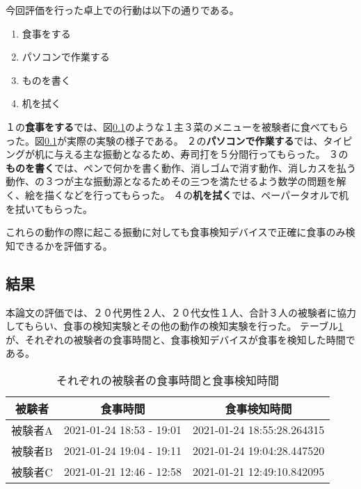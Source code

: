 今回評価を行った卓上での行動は以下の通りである。

\begin{enumerate}
  \item 食事をする
  \item パソコンで作業する
  \item ものを書く
  \item 机を拭く
\end{enumerate}

１の\textbf{食事をする}では、図\ref{}のような１主３菜のメニューを被験者に食べてもらった。図\ref{}が実際の実験の様子である。
２の\textbf{パソコンで作業する}では、タイピングが机に与える主な振動となるため、寿司打\cite{sushida}を５分間行ってもらった。
３の\textbf{ものを書く}では、ペンで何かを書く動作、消しゴムで消す動作、消しカスを払う動作、の３つが主な振動源となるためその三つを満たせるよう数学の問題を解く、絵を描くなどを行ってもらった。
４の\textbf{机を拭く}では、ペーパータオルで机を拭いてもらった。

これらの動作の際に起こる振動に対しても食事検知デバイスで正確に食事のみ検知できるかを評価する。

\subsection{結果}

本論文の評価では、２０代男性２人、２０代女性１人、合計３人の被験者に協力してもらい、食事の検知実験とその他の動作の検知実験を行った。
テーブル\ref{tb:meal_detection_result}が、それぞれの被験者の食事時間と、食事検知デバイスが食事を検知した時間である。

\begin{table}[htbp]
  \caption{それぞれの被験者の食事時間と食事検知時間}
  \label{tb:meal_detection_result}
  \begin{center}
    \begin{tabular}{|c||c|c|}
      \hline
      被験者  & 食事時間 & 食事検知時間 \\
      \hline\hline
      被験者A & 2021-01-24 18:53 - 19:01 & 2021-01-24 18:55:28.264315 \\\hline
      被験者B & 2021-01-24 19:04 - 19:11 & 2021-01-24 19:04:28.447520 \\\hline
      被験者C & 2021-01-21 12:46 - 12:58 & 2021-01-21 12:49:10.842095 \\\hline
    \end{tabular}
  \end{center}
\end{table}

